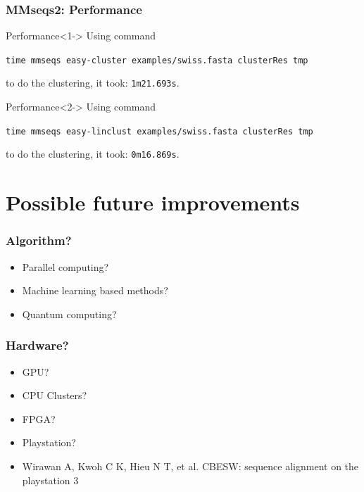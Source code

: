 \documentclass[UTF8]{beamer}
\begin{document}
	\begin{frame}[fragile]
	    \frametitle{MMseqs2: Performance}

		\begin{block}{Performance}<1->
			Using command 
			
			\lstinline{time mmseqs easy-cluster examples/swiss.fasta clusterRes tmp} 
			
			to do the clustering, it took:
			\alert{\lstinline{1m21.693s}}.
		\end{block}

		\begin{block}{Performance}<2->
			Using command 
			
			\lstinline{time mmseqs easy-linclust examples/swiss.fasta clusterRes tmp} 
			
			to do the clustering, it took:
			\alert{\lstinline{0m16.869s}}.
		\end{block}
    \end{frame}

	\section{Possible future improvements}

	\begin{frame}
	    \frametitle{Algorithm?}
		\begin{itemize}
			\item Parallel computing?
			\item Machine learning based methods?
			\item Quantum computing?
		\end{itemize}
    \end{frame}

	\begin{frame}
	    \frametitle{Hardware?}
		\begin{itemize}
			\item GPU?
			\item CPU Clusters?
			\item FPGA?
			\item Playstation?
			\item \small Wirawan A, Kwoh C K, Hieu N T, et al. CBESW: sequence alignment on the playstation 3
		\end{itemize}
    \end{frame}
\end{document}
